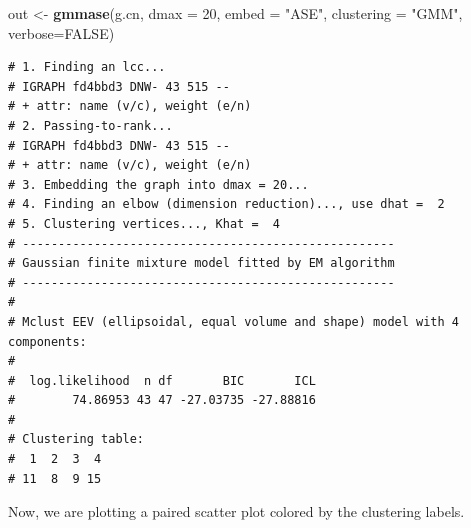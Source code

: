 \documentclass[]{article}
\newenvironment{Shaded}{\begin{snugshade}}{\end{snugshade}}
\newcommand{\KeywordTok}[1]{\textcolor[rgb]{0.13,0.29,0.53}{\textbf{#1}}}
\newcommand{\DataTypeTok}[1]{\textcolor[rgb]{0.13,0.29,0.53}{#1}}
\newcommand{\DecValTok}[1]{\textcolor[rgb]{0.00,0.00,0.81}{#1}}
\newcommand{\StringTok}[1]{\textcolor[rgb]{0.31,0.60,0.02}{#1}}
\newcommand{\OtherTok}[1]{\textcolor[rgb]{0.56,0.35,0.01}{#1}}
\newcommand{\OperatorTok}[1]{\textcolor[rgb]{0.81,0.36,0.00}{\textbf{#1}}}
\newcommand{\NormalTok}[1]{#1}
\begin{document}
\begin{Shaded}
\begin{Highlighting}[]
\NormalTok{out <-}\StringTok{ }\KeywordTok{gmmase}\NormalTok{(g.cn, }\DataTypeTok{dmax =} \DecValTok{20}\NormalTok{, }\DataTypeTok{embed =} \StringTok{"ASE"}\NormalTok{, }\DataTypeTok{clustering =} \StringTok{"GMM"}\NormalTok{, }\DataTypeTok{verbose=}\OtherTok{FALSE}\NormalTok{)}
\end{Highlighting}
\end{Shaded}

\begin{verbatim}
# 1. Finding an lcc...
# IGRAPH fd4bbd3 DNW- 43 515 -- 
# + attr: name (v/c), weight (e/n)
# 2. Passing-to-rank...
# IGRAPH fd4bbd3 DNW- 43 515 -- 
# + attr: name (v/c), weight (e/n)
# 3. Embedding the graph into dmax = 20...
# 4. Finding an elbow (dimension reduction)..., use dhat =  2 
# 5. Clustering vertices..., Khat =  4 
# ----------------------------------------------------
# Gaussian finite mixture model fitted by EM algorithm 
# ----------------------------------------------------
# 
# Mclust EEV (ellipsoidal, equal volume and shape) model with 4 components:
# 
#  log.likelihood  n df       BIC       ICL
#        74.86953 43 47 -27.03735 -27.88816
# 
# Clustering table:
#  1  2  3  4 
# 11  8  9 15
\end{verbatim}

Now, we are plotting a paired scatter plot colored by the clustering
labels.

\begin{Shaded}
\end{Shaded}
\end{document}
